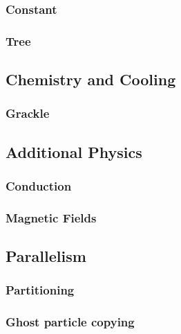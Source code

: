 \subsubsection{Constant}
\subsubsection{Tree}

\subsection{Chemistry and Cooling}
\subsubsection{Grackle}

\subsection{Additional Physics}
\subsubsection{Conduction}
\subsubsection{Magnetic Fields}

\subsection{Parallelism}
\subsubsection{Partitioning}
\subsubsection{Ghost particle copying}
